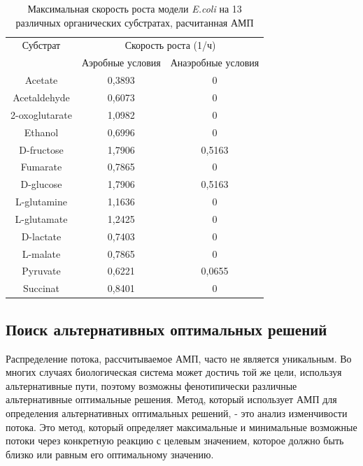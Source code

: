 \documentclass[a4paper, 12pt]{article}
\begin{document}
\begin{table}[H]
\begin{tabular}{ |c|c|c| }
\hline
\multirow{}{}{Субстрат} & \multicolumn{2}{c|}{Скорость роста (1/ч)} \\ \cline{2-3} 
                          & Аэробные условия   & Анаэробные условия   \\ \hline
Acetate                   & 0,3893             & 0                    \\ \hline
Acetaldehyde              & 0,6073             & 0                    \\ \hline
2-oxoglutarate            & 1,0982             & 0                    \\ \hline
Ethanol                   & 0,6996             & 0                    \\ \hline
D-fructose                & 1,7906             & 0,5163               \\ \hline
Fumarate                  & 0,7865             & 0                    \\ \hline
D-glucose                 & 1,7906             & 0,5163               \\ \hline
L-glutamine               & 1,1636             & 0                    \\ \hline
L-glutamate               & 1,2425             & 0                    \\ \hline
D-lactate                 & 0,7403             & 0                    \\ \hline
L-malate                  & 0,7865             & 0                    \\ \hline
Pyruvate                  & 0,6221             & 0,0655               \\ \hline
Succinat                  & 0,8401             & 0                    \\ \hline
\end{tabular}
\caption{Максимальная скорость роста модели \textit{E.coli} на 13 различных органических субстратах, расчитанная АМП}
\label{t:1}
\end{table}

\subsection{Поиск альтернативных оптимальных решений}

Распределение потока, рассчитываемое АМП, часто не является уникальным. Во многих случаях биологическая система может достичь той же цели, используя альтернативные пути, поэтому возможны фенотипически различные альтернативные оптимальные решения. Метод, который использует АМП для определения альтернативных оптимальных решений, - это анализ изменчивости потока. Это метод, который определяет максимальные и минимальные возможные потоки через конкретную реакцию с целевым значением, которое должно быть близко или равным его оптимальному значению.
\end{document}

